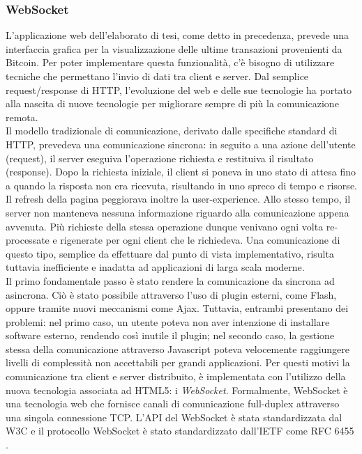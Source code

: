 \subsubsection{WebSocket}
\label{sec:WebSocket}
L'applicazione web dell'elaborato di tesi, come detto in precedenza, prevede una interfaccia grafica per la visualizzazione delle ultime transazioni provenienti da Bitcoin. Per poter implementare questa funzionalità, c'è bisogno di utilizzare tecniche che permettano l'invio di dati tra client e server. Dal semplice request/response di HTTP, l'evoluzione del web e delle sue tecnologie ha portato alla nascita di nuove tecnologie per migliorare sempre di più la comunicazione remota.
\\Il modello tradizionale di comunicazione, derivato dalle specifiche standard di HTTP, prevedeva una comunicazione sincrona: in seguito a una azione dell'utente (request), il server eseguiva l'operazione richiesta e restituiva il risultato (response). Dopo la richiesta iniziale, il client si poneva in uno stato di attesa fino a quando la risposta non era ricevuta, risultando in uno spreco di tempo e risorse. Il refresh della pagina peggiorava inoltre la user-experience. Allo stesso tempo, il server non manteneva nessuna informazione riguardo alla comunicazione appena avvenuta. Più richieste della stessa operazione dunque venivano ogni volta re-processate e rigenerate per ogni client che le richiedeva. Una comunicazione di questo tipo, semplice da effettuare dal punto di vista implementativo, risulta tuttavia inefficiente e inadatta ad applicazioni di larga scala moderne.
\\Il primo fondamentale passo è stato rendere la comunicazione da sincrona ad asincrona. Ciò è stato possibile attraverso l'uso di plugin esterni, come Flash, oppure tramite nuovi meccanismi come Ajax. Tuttavia, entrambi presentano dei problemi: nel primo caso, un utente poteva non aver intenzione di installare software esterno, rendendo così inutile il plugin; nel secondo caso, la gestione stessa della comunicazione attraverso Javascript poteva velocemente raggiungere livelli di complessità non accettabili per grandi applicazioni. Per questi motivi la comunicazione tra client e server distribuito, è implementata con l'utilizzo della nuova tecnologia associata ad HTML5: i \textit{WebSocket}.
Formalmente, WebSocket è una tecnologia web che fornisce canali di comunicazione full-duplex attraverso una singola connessione TCP. L'API del WebSocket è stata standardizzata dal W3C e il protocollo WebSocket è stato standardizzato dall'IETF come RFC 6455 \cite{websocket:wiki}.

